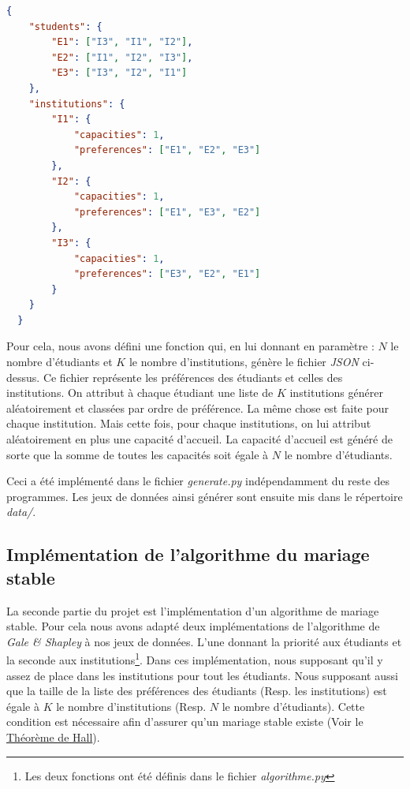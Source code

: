 \documentclass[12pt,titlepage]{article}
\begin{document}
\newpage

\begin{lstlisting}[language=json, caption="Exemple d'un fichier de préférences"]
  {
    "students": {
        "E1": ["I3", "I1", "I2"],
        "E2": ["I1", "I2", "I3"],
        "E3": ["I3", "I2", "I1"]
    },
    "institutions": {
        "I1": {
            "capacities": 1,
            "preferences": ["E1", "E2", "E3"]
        },
        "I2": {
            "capacities": 1,
            "preferences": ["E1", "E3", "E2"]
        },
        "I3": {
            "capacities": 1,
            "preferences": ["E3", "E2", "E1"]
        }
    }
  }
\end{lstlisting}

Pour cela, nous avons défini une fonction qui, en lui donnant en paramètre : $N$ le nombre d'étudiants et $K$ le nombre d'institutions, génère le fichier \textit{JSON} ci-dessus. Ce fichier représente les préférences des étudiants et celles des institutions. On attribut à chaque étudiant une liste de $K$ institutions générer aléatoirement et classées par ordre de préférence. La même chose est faite pour chaque institution. Mais cette fois, pour chaque institutions, on lui attribut aléatoirement en plus une capacité d'accueil. La capacité d'accueil est généré de sorte que la somme de toutes les capacités soit égale à $N$ le nombre d'étudiants.

Ceci a été implémenté dans le fichier \textit{generate.py} indépendamment du reste des programmes. Les jeux de données ainsi générer sont ensuite mis dans le répertoire \textit{data/}.

\subsection{Implémentation de l'algorithme du mariage stable}

La seconde partie du projet est l'implémentation d'un algorithme de mariage stable. Pour cela nous avons adapté deux implémentations de l'algorithme de \textit{Gale \& Shapley} à nos jeux de données. L'une donnant la priorité aux étudiants et la seconde aux institutions\footnote{Les deux fonctions ont été définis dans le fichier \textit{algorithme.py}}. Dans ces implémentation, nous supposant qu'il y assez de place dans les institutions pour tout les étudiants. Nous supposant aussi que la taille de la liste des préférences des étudiants (Resp. les institutions) est égale à $K$ le nombre d'institutions (Resp. $N$ le nombre d'étudiants). Cette condition est nécessaire afin d'assurer qu'un mariage stable existe (Voir le \href{https://fr.wikipedia.org/wiki/Th%C3%A9or%C3%A8me_de_Hall}{Théorème de Hall}).
\end{document}
